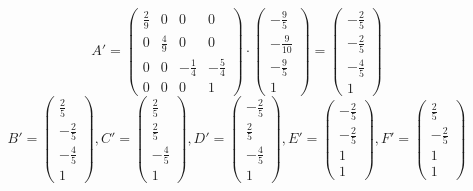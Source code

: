 \documentclass[fleqn]{article}
\begin{document}
$$A' = 
\begin{pmatrix}
    \frac{2}{9} & 0 & 0 & 0 \\
    0 & \frac{4}{9} & 0 & 0 \\
    0 & 0 & -\frac{1}{4} & -\frac{5}{4} \\
    0 & 0 & 0 & 1
\end{pmatrix} \cdot
\begin{pmatrix}
    -\frac{9}{5} \\ -\frac{9}{10} \\ -\frac{9}{5} \\ 1  
\end{pmatrix} = 
\begin{pmatrix}
    -\frac{2}{5} \\ -\frac{2}{5} \\ -\frac{4}{5} \\ 1
\end{pmatrix} 
$$
$$
B' =
\begin{pmatrix}
    \frac{2}{5} \\ -\frac{2}{5} \\ -\frac{4}{5} \\ 1
\end{pmatrix}, 
C'=
\begin{pmatrix}
    \frac{2}{5} \\ \frac{2}{5} \\ -\frac{4}{5} \\ 1    
\end{pmatrix}, 
D'=
\begin{pmatrix}
    -\frac{2}{5} \\ \frac{2}{5} \\ -\frac{4}{5} \\ 1    
\end{pmatrix}, 
E'=
\begin{pmatrix}
    -\frac{2}{5} \\ -\frac{2}{5} \\ 1 \\ 1    
\end{pmatrix}, 
F'=
\begin{pmatrix}
    \frac{2}{5} \\ -\frac{2}{5} \\ 1 \\ 1    
\end{pmatrix}
$$
\end{document}
